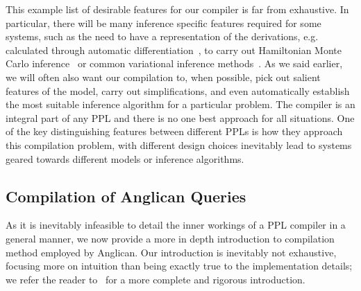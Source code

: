 This example list of desirable features for our compiler is far from exhaustive.
In particular, there will be many inference specific features required for some
systems, such as the need to have a representation of the derivations, e.g. calculated
through automatic differentiation~\cite{baydin2015automatic}, to carry out 
Hamiltonian Monte Carlo inference~\cite{carpenter2015stan}
or common variational inference methods~\citep{kucukelbir2015automatic}.  As we
said earlier, we will often also want our compilation to, when possible,
pick out salient features of the model, carry out simplifications, and even automatically 
establish the most suitable inference algorithm for a particular problem.  The compiler
is an integral part of any PPL and there is no one best approach for all situations. 
One of the key distinguishing features between different PPLs is how they approach
this compilation problem, with different design choices inevitably lead to systems
geared towards different models or inference algorithms. 

\subsection{Compilation of Anglican Queries}
\label{sec:proginf:comp:ang}

As it is inevitably infeasible to detail the inner workings of a PPL compiler in a general
manner, we now provide a more in depth introduction to compilation method
employed by Anglican.  Our introduction is inevitably not exhaustive, focusing more on
intuition than being exactly true to the implementation details; we refer the reader
to~\citep{tolpin2016design} for a more complete and rigorous introduction.

